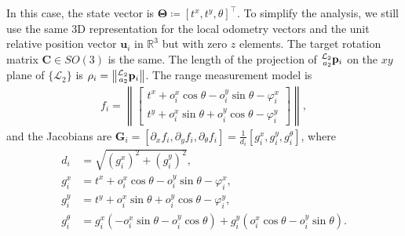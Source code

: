 \documentclass[journal]{IEEEtran}
\newcommand{\norm}[1]{\left\lVert#1\right\rVert}
\def\LocPosTarg{\prescript{\mathcal{L}_2}{a_2}{\mathbf{p}}} %
\def\StateVector{\mathbf{\Theta}}
\begin{document}
\begin{appendices}
In this case, the state vector is $\StateVector \coloneqq [t^x, t^y, \theta]^\top$. To simplify the analysis, we still use the same 3D representation for the local odometry vectors and the unit relative position vector $\mathbf{u}_i$ in $\mathbb{R}^3$ but with zero $z$ elements. The target rotation matrix $\mathbf{C} \in SO(3)$ is the same. The length of the projection of $\LocPosTarg_i$ on the $xy$ plane of $\{\mathcal{L}_2\}$ is $\rho_i = \norm{\LocPosTarg_i}$. The range measurement model is
\begin{equation}
\begin{aligned}
    f_i =
    \norm{
    \begin{bmatrix}
        t^x 
        + o^x_i \cos{\theta}  
        - o^y_i \sin{\theta} 
        - \varphi^x_i \\
        t^y 
        + o^x_i \sin{\theta} 
        + o^y_i \cos{\theta} 
        - \varphi^y_i
    \end{bmatrix}
    },
\end{aligned}
\end{equation}
and the Jacobians are $\mathbf{G}_i 
= \left[ \partial_x f_i, \partial_y f_i, \partial_{\theta} f_i \right]
= \frac{1}{d_i} [g^x_i, g^y_i, g^{\theta}_i]$,
where
\begin{equation}\label{eq:hi123}
\begin{aligned}
    d_i &= \sqrt{(g^x_i)^2 + (g^y_i)^2}, \\
    g^x_i &= 
    t^x + o^x_i \cos{\theta} - o^y_i \sin{\theta} - \varphi^x_i, \\
    g^y_i &= 
    t^y + o^x_i \sin{\theta} + o^y_i \cos{\theta} - \varphi^y_i, \\
    g^{\theta}_i &= 
    g^x_i(-o^x_i \sin{\theta}  - o^y_i \cos{\theta}) + g^y_i( o^x_i \cos{\theta} - o^y_i \sin{\theta}).
\end{aligned}
\end{equation} 


\end{appendices}
\end{document}
